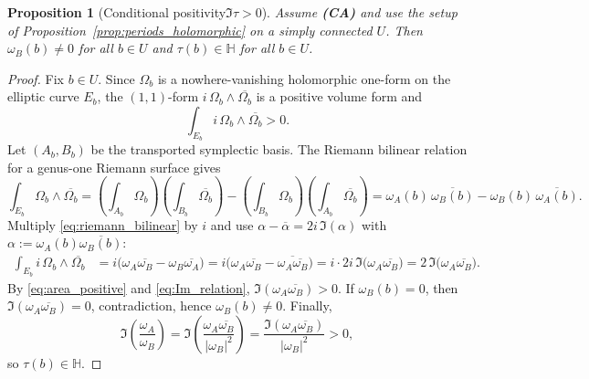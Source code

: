 \documentclass[11pt]{article}
\newtheorem{proposition}[theorem]{Proposition}
\theoremstyle{remark}
\begin{document}
{\begin{proposition}[Conditional positivity\:$\Im\tau>0$]\label{prop:Imtau_positive}
Assume \textbf{(CA)} and use the setup of Proposition~\ref{prop:periods_holomorphic} on a simply connected $U$. Then $\omega_B(b)\neq 0$ for all $b\in U$ and $\tau(b)\in\mathbb{H}$ for all $b\in U$.
\end{proposition}
\begin{proof}
Fix $b\in U$. Since $\Omega_b$ is a nowhere-vanishing holomorphic one-form on the elliptic curve $E_b$, the $(1,1)$-form $i\,\Omega_b\wedge \overline{\Omega_b}$ is a positive volume form and
\begin{equation}\label{eq:area_positive}
\int_{E_b} i\,\Omega_b\wedge \overline{\Omega_b}>0.
\end{equation}
Let $(A_b,B_b)$ be the transported symplectic basis. The Riemann bilinear relation for a genus-one Riemann surface gives
\begin{equation}\label{eq:riemann_bilinear}
\int_{E_b}\Omega_b\wedge \overline{\Omega_b}=\left(\int_{A_b}\Omega_b\right)\left(\int_{B_b}\overline{\Omega_b}\right)-\left(\int_{B_b}\Omega_b\right)\left(\int_{A_b}\overline{\Omega_b}\right)=\omega_A(b)\,\overline{\omega_B(b)}-\omega_B(b)\,\overline{\omega_A(b)}.
\end{equation}
Multiply \eqref{eq:riemann_bilinear} by $i$ and use $\alpha-\overline{\alpha}=2i\,\Im(\alpha)$ with $\alpha:=\omega_A(b)\overline{\omega_B(b)}$:
\begin{align}\label{eq:Im_relation}
\int_{E_b} i\,\Omega_b\wedge \overline{\Omega_b}
&= i\bigl(\omega_A\overline{\omega_B}-\omega_B\overline{\omega_A}\bigr)
= i\bigl(\omega_A\overline{\omega_B}-\overline{\omega_A\overline{\omega_B}}\bigr)
= i\cdot 2i\,\Im\bigl(\omega_A\overline{\omega_B}\bigr)
= 2\,\Im\bigl(\omega_A\overline{\omega_B}\bigr).
\end{align}
By \eqref{eq:area_positive} and \eqref{eq:Im_relation}, $\Im(\omega_A\overline{\omega_B})>0$. If $\omega_B(b)=0$, then $\Im(\omega_A\overline{\omega_B})=0$, contradiction, hence $\omega_B(b)\neq 0$. Finally,
\begin{equation}\label{eq:Imtau_from_periods}
\Im\!\left(\frac{\omega_A}{\omega_B}\right)=\Im\!\left(\frac{\omega_A\overline{\omega_B}}{|\omega_B|^2}\right)=\frac{\Im(\omega_A\overline{\omega_B})}{|\omega_B|^2}>0,
\end{equation}
so $\tau(b)\in\mathbb{H}$.
\end{proof}

}
\end{document}
